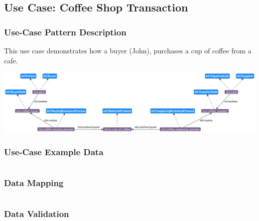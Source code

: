 \subsection*{Use Case: Coffee Shop Transaction}
\subsubsection*{Use-Case Pattern Description}
This use case demonstrates how a buyer (John), purchases a cup of coffee from a cafe. 

\includegraphics[scale=0.35]{scenarios/different-type-agent/image/different-type-agent.png}


\subsubsection*{Use-Case Example Data}


\begin{table}[h]
\label{tab:organization-structure}
\begin{tabular}{|l|l|}
\hline

\hline
\end{tabular}%
\end{table}


\subsubsection*{Data Mapping}
\begin{verbatim}

\end{verbatim}



\subsubsection*{Data Validation}
